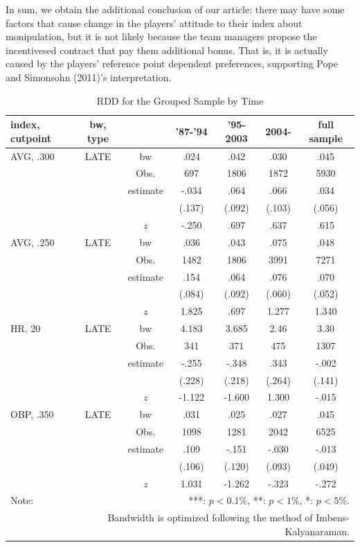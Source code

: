 \documentclass[dvipdfmx, 12pt]{article}
\begin{document}
In sum, we obtain the additional conclusion of our article: there may have some factors that cause change in the players' attitude to their index about monipulation, but it is not likely because the team managers propose the incentivesed contract that pay them additional bonus. That is, it is actually caused by the players' reference point dependent preferences, supporting Pope and Simonsohn (2011)'s interpretation.

\begin{table}
  \centering
  \caption{RDD for the Grouped Sample by Time}
  \label{RDD_Era}
  \footnotesize
  \begin{tabular}{lcccccc} \hline
    index, cutpoint & bw, type &  &'87-'94 & '95-2003 & 2004- &full sample \\ \hline \hline
    AVG, .300 & LATE & bw & .024 & .042 & .030 & .045 \\
    &  & Obs. & 697 & 1806 & 1872 & 5930 \\
    &  & estimate & -.034 & .064 & .066 & .034 \\
    &  & & (.137) & (.092) & (.103) & (.056) \\
    & & $z$ & -.250 & .697 & .637 & .615 \\ \hline
    AVG, .250 & LATE & bw & .036 & .043 &.075 & .048 \\
    &  & Obs. & 1482 & 1806 & 3991 & 7271 \\
    &  & estimate & .154 & .064 & .076 & .070 \\
    &  & & (.084) & (.092) & (.060) & (.052) \\
    & & $z$ & 1.825 & .697 & 1.277 & 1.340 \\ \hline
    HR, 20 & LATE & bw & 4.183 & 3.685 & 2.46 & 3.30 \\
    &  & Obs. & 341 & 371 & 475 & 1307 \\
    &  & estimate & -.255 & -.348 & .343 & -.002 \\
    &  & & (.228) & (.218) & (.264) & (.141) \\
    & & $z$ & -1.122 & -1.600 & 1.300 & -.015 \\ \hline
    OBP, .350 & LATE & bw & .031 & .025 & .027 & .045 \\
    &  & Obs. & 1098 & 1281 & 2042 & 6525 \\
    &  & estimate & .109 & -.151 & -.030 & -.013 \\
    &  & & (.106) & (.120) & (.093) & (.049) \\
    & & $z$ & 1.031 & -1.262 & -.323 & -.272 \\ \hline
    Note: & \multicolumn{6}{r}{***: $p<0.1\%$, **: $p<1\%$, *: $p<5\%$.} \\
    & \multicolumn{6}{r}{Bandwidth is optimized following the method of Imbens-Kalyanaraman.}
  \end{tabular}
\end{table}
\end{document}
